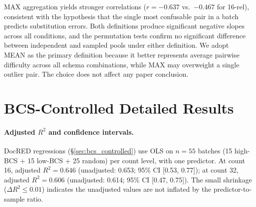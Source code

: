 \documentclass[11pt]{article}
\begin{document}
MAX aggregation yields stronger correlations ($r = -0.637$ vs.\ $-0.467$ for 16-rel), consistent with the hypothesis that the single most confusable pair in a batch predicts substitution errors. Both definitions produce significant negative slopes across all conditions, and the permutation tests confirm no significant difference between independent and sampled pools under either definition. We adopt MEAN as the primary definition because it better represents average pairwise difficulty across all schema combinations, while MAX may overweight a single outlier pair. The choice does not affect any paper conclusion.

\section{BCS-Controlled Detailed Results}
\label{app:bcs-controlled-table}

\begin{table}[h]
\centering
\small
\caption{BCS-controlled FewRel accuracy. Low-BCS batches contain maximally dissimilar types; high-BCS batches contain maximally similar types. The 80-relation extreme-batch gap reflects the wider BCS range; regression slopes are consistent across pools ($p = 0.60$; Table~\ref{tab:within_pool}; see \S\ref{sec:practical_magnitude} for typical-batch magnitudes). The 16-relation condition used a single extreme batch per BCS level; bootstrap CIs require multiple batches.}
\label{tab:bcs_controlled}
\end{table}

\paragraph{Adjusted $R^2$ and confidence intervals.}
DocRED regressions (\S\ref{sec:bcs_controlled}) use OLS on $n = 55$ batches (15 high-BCS + 15 low-BCS + 25 random) per count level, with one predictor. At count 16, adjusted $R^2 = 0.646$ (unadjusted: 0.653; 95\% CI [0.53, 0.77]); at count 32, adjusted $R^2 = 0.606$ (unadjusted: 0.614; 95\% CI [0.47, 0.75]). The small shrinkage ($\Delta R^2 \leq 0.01$) indicates the unadjusted values are not inflated by the predictor-to-sample ratio.
\end{document}
